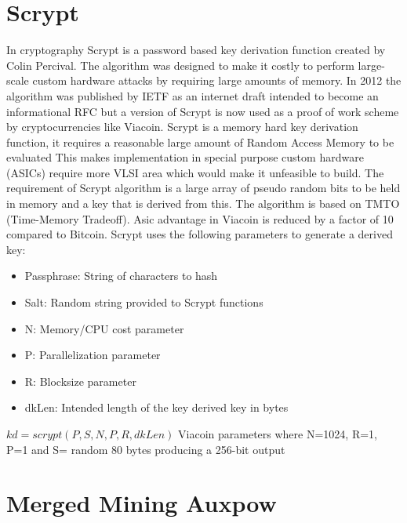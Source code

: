 \documentclass{article}
\begin{document}
\section{Scrypt}\label{sec: Scrypt}
In cryptography \cite{scrypt}Scrypt is a password based key derivation function created by Colin Percival. The algorithm was designed to make it costly to perform large-scale custom hardware attacks by requiring large amounts of memory. In 2012 the algorithm was published by IETF as an internet draft intended to become an informational RFC but a version of Scrypt is now used as a proof of work scheme by cryptocurrencies like Viacoin. 
\newline \newline \noindent
Scrypt is a memory hard key derivation function, it requires a reasonable large amount of Random Access Memory to be evaluated
This makes implementation in special purpose custom hardware (ASICs) require more VLSI area which would make it unfeasible to build. The requirement of Scrypt algorithm is a large array of pseudo random bits to be held in memory and a key that is derived from this. The algorithm is based on TMTO (Time-Memory Tradeoff). Asic advantage in Viacoin is reduced by a factor of 10 compared to Bitcoin. 
\newline \newline \noindent
Scrypt uses the following parameters to generate a derived key:
\begin{itemize}
\item Passphrase: String of characters to hash
\item Salt: Random string provided to Scrypt functions
\item N: Memory/CPU cost parameter
\item P: Parallelization parameter
\item R: Blocksize parameter
\item dkLen: Intended length of the key derived key in bytes
\end{itemize}
$kd = scrypt(P, S, N, P, R, dkLen)$
\newline \newline \noindent
Viacoin parameters where N=1024, R=1, P=1 and S= random 80 bytes producing a 256-bit output

\section{Merged Mining Auxpow}\label{sec:Merged Mining Auxpow}
\end{document}
